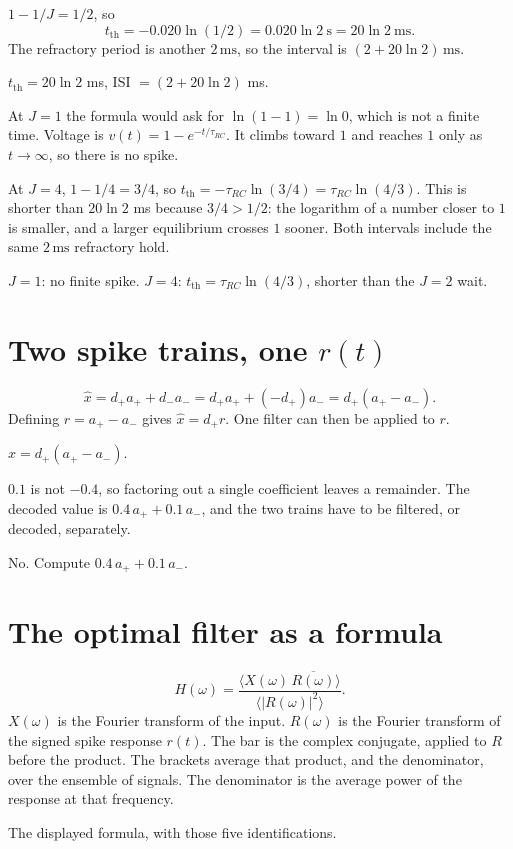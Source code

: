 \documentclass[11pt,letterpaper]{article}
\newcommand{\trc}{\tau_{RC}}
\newcommand{\ans}[1]{\par\vspace{2pt}{\bfseries #1}\quad}
\begin{document}
\ans{1.}
$1 - 1/J = 1/2$, so
\[
t_{\mathrm{th}} = -0.020\ln(1/2) = 0.020\ln 2\ \mathrm{s} = 20\ln 2\ \mathrm{ms}.
\]
The refractory period is another $2\,\mathrm{ms}$, so the interval is $(2 + 20\ln 2)\,\mathrm{ms}$.
\begin{result}
$t_{\mathrm{th}} = 20\ln 2$ ms, ISI $= (2 + 20\ln 2)$ ms.
\end{result}

\ans{2.}
At $J = 1$ the formula would ask for $\ln(1 - 1) = \ln 0$, which is not a finite time. Voltage is $v(t) = 1 - e^{-t/\trc}$. It climbs toward $1$ and reaches $1$ only as $t \to \infty$, so there is no spike.

At $J = 4$, $1 - 1/4 = 3/4$, so $t_{\mathrm{th}} = -\trc\ln(3/4) = \trc\ln(4/3)$. This is shorter than $20\ln 2$ ms because $3/4 > 1/2$: the logarithm of a number closer to $1$ is smaller, and a larger equilibrium crosses $1$ sooner. Both intervals include the same $2\,\mathrm{ms}$ refractory hold.
\begin{result}
$J = 1$: no finite spike. $J = 4$: $t_{\mathrm{th}} = \trc\ln(4/3)$, shorter than the $J = 2$ wait.
\end{result}

\section{Two spike trains, one $r(t)$}

\ans{1.}
\[
\hat{x} = d_+ a_+ + d_- a_- = d_+ a_+ + (-d_+)a_- = d_+(a_+ - a_-).
\]
Defining $r = a_+ - a_-$ gives $\hat{x} = d_+ r$. One filter can then be applied to $r$.
\begin{result}
$\hat{x} = d_+(a_+ - a_-)$.
\end{result}

\ans{2.}
$0.1$ is not $-0.4$, so factoring out a single coefficient leaves a remainder. The decoded value is $0.4\,a_+ + 0.1\,a_-$, and the two trains have to be filtered, or decoded, separately.
\begin{result}
No. Compute $0.4\,a_+ + 0.1\,a_-$.
\end{result}

\section{The optimal filter as a formula}

\ans{1.}
\[
H(\omega) = \frac{\langle X(\omega)\,\overline{R(\omega)}\rangle}{\langle |R(\omega)|^2\rangle}.
\]
$X(\omega)$ is the Fourier transform of the input. $R(\omega)$ is the Fourier transform of the signed spike response $r(t)$. The bar is the complex conjugate, applied to $R$ before the product. The brackets average that product, and the denominator, over the ensemble of signals. The denominator is the average power of the response at that frequency.
\begin{result}
The displayed formula, with those five identifications.
\end{result}
\end{document}
